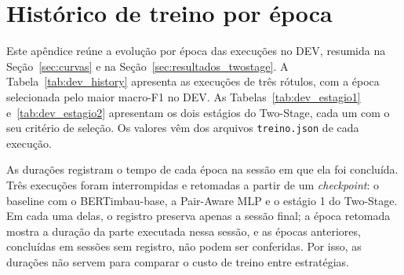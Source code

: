 \chapter[Histórico de treino por época]{Histórico de treino por época}
\label{ap:historico}

Este apêndice reúne a evolução por época das execuções no DEV, resumida na
Seção~\ref{sec:curvas} e na Seção~\ref{sec:resultados_twostage}. A
Tabela~\ref{tab:dev_history} apresenta as execuções de três rótulos, com a época
selecionada pelo maior macro-F1 no DEV. As Tabelas~\ref{tab:dev_estagio1}
e~\ref{tab:dev_estagio2} apresentam os dois estágios do Two-Stage, cada um com o seu
critério de seleção. Os valores vêm dos arquivos \texttt{treino.json} de cada
execução.

As durações registram o tempo de cada época na sessão em que ela foi concluída. Três
execuções foram interrompidas e retomadas a partir de um \emph{checkpoint}: o
baseline com o BERTimbau-base, a Pair-Aware MLP e o estágio 1 do Two-Stage. Em cada
uma delas, o registro preserva apenas a sessão final; a época retomada mostra a
duração da parte executada nessa sessão, e as épocas anteriores, concluídas em sessões
sem registro, não podem ser conferidas. Por isso, as durações não servem para comparar
o custo de treino entre estratégias.






